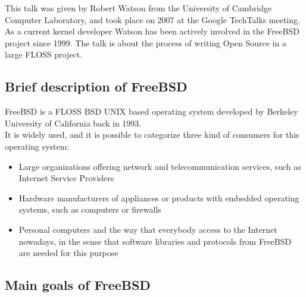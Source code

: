 \documentclass[11pt]{article} %
\begin{document}
This talk was given by Robert Watson from the University of Cambridge Computer Laboratory, and took place on 2007 at the Google TechTalks meeting. As a current kernel developer Watson has been actively involved in the FreeBSD project since 1999. The talk is about the process of writing Open Source in a large FLOSS project.


\subsection{Brief description of FreeBSD}

FreeBSD is a FLOSS BSD UNIX based operating system developed by Berkeley University of California back in 1993.\\

It is widely used, and it is possible to categorize three kind of consumers for this operating system:

\begin{itemize}
  \item Large organizations offering network and telecommunication services, such as Internet Service Providers
  \item Hardware manufacturers of appliances or products with embedded operating systems, such as computers or firewalls
  \item Personal computers and the way that everybody access to the Internet nowadays, in the sense that software libraries and protocols from FreeBSD are needed for this purpose
\end{itemize}


\subsection{Main goals of FreeBSD}
\end{document}
